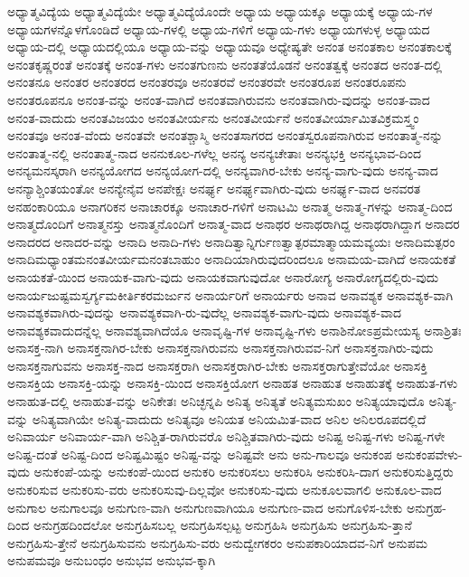 {ಅಧ್ಯಾತ್ಮವಿದ್ಯೆಯ
ಅಧ್ಯಾತ್ಮವಿದ್ಯೆಯೇ
ಅಧ್ಯಾತ್ಮವಿದ್ಯೆಯೊಂದೇ
ಅಧ್ಯಾಯ
ಅಧ್ಯಾಯಕ್ಕೂ
ಅಧ್ಯಾಯಕ್ಕೆ
ಅಧ್ಯಾಯ-ಗಳ
ಅಧ್ಯಾಯಗಳನ್ನೊಳಗೊಂಡಿದೆ
ಅಧ್ಯಾಯ-ಗಳಲ್ಲಿ
ಅಧ್ಯಾಯ-ಗಳಿಗೆ
ಅಧ್ಯಾಯ-ಗಳು
ಅಧ್ಯಾಯಗಳುಳ್ಳ
ಅಧ್ಯಾಯದ
ಅಧ್ಯಾಯ-ದಲ್ಲಿ
ಅಧ್ಯಾಯದಲ್ಲಿಯೂ
ಅಧ್ಯಾಯ-ವನ್ನು
ಅಧ್ಯಾಯವೂ
ಅಧ್ಯೇಷ್ಯತೇ
ಅನಂತ
ಅನಂತಕಾಲ
ಅನಂತಕಾಲಕ್ಕೆ
ಅನಂತಕೃಷ್ಣರಂತೆ
ಅನಂತಕ್ಕೆ
ಅನಂತ-ಗಳು
ಅನಂತಗುಣನು
ಅನಂತತೆಯೊಡನೆ
ಅನಂತತ್ವಕ್ಕೆ
ಅನಂತದ
ಅನಂತ-ದಲ್ಲಿ
ಅನಂತನೂ
ಅನಂತರ
ಅನಂತರದ
ಅನಂತರವೂ
ಅನಂತರವೆ
ಅನಂತರವೇ
ಅನಂತರೂಪ
ಅನಂತರೂಪನು
ಅನಂತರೂಪನೂ
ಅನಂತ-ವನ್ನು
ಅನಂತ-ವಾಗಿದೆ
ಅನಂತವಾಗಿರುವನು
ಅನಂತವಾಗಿರು-ವುದನ್ನು
ಅನಂತ-ವಾದ
ಅನಂತ-ವಾದುದು
ಅನಂತವಿಜಯಂ
ಅನಂತವೀರ್ಯನು
ಅನಂತವೀರ್ಯನೆ
ಅನಂತವೀರ್ಯಾಮಿತವಿಕ್ರಮಸ್ತ್ವಂ
ಅನಂತವೂ
ಅನಂತ-ವೆಂದು
ಅನಂತವೇ
ಅನಂತಶ್ಚಾಸ್ಮಿ
ಅನಂತಸಾಗರದ
ಅನಂತಸ್ವರೂಪನಾಗಿರುವ
ಅನಂತಾತ್ಮ-ನನ್ನು
ಅನಂತಾತ್ಮ-ನಲ್ಲಿ
ಅನಂತಾತ್ಮ-ನಾದ
ಅನನುಕೂಲ-ಗಳೆಲ್ಲ
ಅನನ್ಯ
ಅನನ್ಯಚೇತಾಃ
ಅನನ್ಯಭಕ್ತಿ
ಅನನ್ಯಭಾವ-ದಿಂದ
ಅನನ್ಯಮನಸ್ಕರಾಗಿ
ಅನನ್ಯಯೋಗದ
ಅನನ್ಯಯೋಗ-ದಲ್ಲಿ
ಅನನ್ಯವಾಗಿರ-ಬೇಕು
ಅನನ್ಯ-ವಾಗು-ವುದು
ಅನನ್ಯ-ವಾದ
ಅನನ್ಯಾಶ್ಚಿಂತಯಂತೋ
ಅನನ್ಯೇನೈವ
ಅನಪೇಕ್ಷಃ
ಅನರ್ಘ್ಯ
ಅನರ್ಘ್ಯವಾಗಿರು-ವುದು
ಅನರ್ಘ್ಯ-ವಾದ
ಅನವರತ
ಅನಹಂಕಾರಿಯೂ
ಅನಾಗರಿಕನ
ಅನಾಚಾರಕ್ಕೂ
ಅನಾಚಾರ-ಗಳಿಗೆ
ಅನಾಟಮಿ
ಅನಾತ್ಮ
ಅನಾತ್ಮ-ಗಳನ್ನು
ಅನಾತ್ಮ-ದಿಂದ
ಅನಾತ್ಮದೊಂದಿಗೆ
ಅನಾತ್ಮನಸ್ತು
ಅನಾತ್ಮನೊಂದಿಗೆ
ಅನಾತ್ಮ-ವಾದ
ಅನಾಥರ
ಅನಾಥರಾಗಿದ್ದ
ಅನಾಥರಾಗಿದ್ದಾಗ
ಅನಾದರ
ಅನಾದರದ
ಅನಾದರ-ವನ್ನು
ಅನಾದಿ
ಅನಾದಿ-ಗಳು
ಅನಾದಿತ್ವಾನ್ನಿರ್ಗುಣತ್ವಾತ್ಪರಮಾತ್ಮಾಯಮವ್ಯಯಃ
ಅನಾದಿಮತ್ಪರಂ
ಅನಾದಿಮಧ್ಯಾಂತಮನಂತವೀರ್ಯಮನಂತಬಾಹುಂ
ಅನಾದಿಯಾಗಿರುವುದರಿಂದಲೂ
ಅನಾಮಯ-ವಾಗಿದೆ
ಅನಾಯಕತೆ
ಅನಾಯಕತೆ-ಯಿಂದ
ಅನಾಯಕ-ವಾಗು-ವುದು
ಅನಾಯಕವಾಗುವುದೋ
ಅನಾರೋಗ್ಯ
ಅನಾರೋಗ್ಯದಲ್ಲಿರು-ವುದು
ಅನಾರ್ಯಜುಷ್ಟಮಸ್ವರ್ಗ್ಯಮಕೀರ್ತಿಕರಮರ್ಜುನ
ಅನಾರ್ಯರಿಗೆ
ಅನಾರ್ಯರು
ಅನಾವ
ಅನಾವಶ್ಯಕ
ಅನಾವಶ್ಯಕ-ವಾಗಿ
ಅನಾವಶ್ಯಕವಾಗಿರು-ವುದನ್ನು
ಅನಾವಶ್ಯಕವಾಗಿ-ರು-ವುದೆಲ್ಲ
ಅನಾವಶ್ಯಕ-ವಾಗು-ವುದು
ಅನಾವಶ್ಯಕ-ವಾದ
ಅನಾವಶ್ಯಕವಾದುದನ್ನೆಲ್ಲ
ಅನಾವಶ್ಯವಾಗಿದೆಯೊ
ಅನಾವೃಷ್ಟಿ-ಗಳ
ಅನಾವೃಷ್ಟಿ-ಗಳು
ಅನಾಶಿನೋಽಪ್ರಮೇಯಸ್ಯ
ಅನಾಶ್ರಿತಃ
ಅನಾಸಕ್ತ-ನಾಗಿ
ಅನಾಸಕ್ತನಾಗಿರ-ಬೇಕು
ಅನಾಸಕ್ತನಾಗಿರುವನು
ಅನಾಸಕ್ತನಾಗಿರುವವ-ನಿಗೆ
ಅನಾಸಕ್ತನಾಗಿರು-ವುದು
ಅನಾಸಕ್ತನಾಗುವನು
ಅನಾಸಕ್ತ-ನಾದ
ಅನಾಸಕ್ತರಾಗಿ
ಅನಾಸಕ್ತರಾಗಿರ-ಬೇಕು
ಅನಾಸಕ್ತರಾಗುತ್ತೇವೆಯೋ
ಅನಾಸಕ್ತಿ
ಅನಾಸಕ್ತಿಯ
ಅನಾಸಕ್ತಿ-ಯನ್ನು
ಅನಾಸಕ್ತಿ-ಯಿಂದ
ಅನಾಸಕ್ತಿಯೋಗ
ಅನಾಹತ
ಅನಾಹುತ
ಅನಾಹುತಕ್ಕೆ
ಅನಾಹುತ-ಗಳು
ಅನಾಹುತ-ದಲ್ಲಿ
ಅನಾಹುತ-ವನ್ನು
ಅನಿಕೇತಃ
ಅನಿಚ್ಛನ್ನಪಿ
ಅನಿತ್ಯ
ಅನಿತ್ಯತೆ
ಅನಿತ್ಯಮಸುಖಂ
ಅನಿತ್ಯಯಾವುದೊ
ಅನಿತ್ಯ-ವನ್ನು
ಅನಿತ್ಯವಾಗಿಯೇ
ಅನಿತ್ಯ-ವಾದುದು
ಅನಿತ್ಯವೂ
ಅನಿಯತ
ಅನಿಯಮಿತ-ವಾದ
ಅನಿಲ
ಅನಿಲರೂಪದಲ್ಲಿದೆ
ಅನಿವಾರ್ಯ
ಅನಿವಾರ್ಯ-ವಾಗಿ
ಅನಿಶ್ಚಿತ-ರಾಗಿರುವರೊ
ಅನಿಶ್ಚಿತವಾಗಿರು-ವುದು
ಅನಿಷ್ಟ
ಅನಿಷ್ಟ-ಗಳು
ಅನಿಷ್ಟ-ಗಳೇ
ಅನಿಷ್ಟ-ದಂತೆ
ಅನಿಷ್ಟ-ದಿಂದ
ಅನಿಷ್ಟಮಿಷ್ಟಂ
ಅನಿಷ್ಟ-ವನ್ನು
ಅನಿಷ್ಟವೇ
ಅನು
ಅನು-ಗಾಲವೂ
ಅನುಕಂಪ
ಅನುಕಂಪವೇಳು-ವುದು
ಅನುಕಂಪೆ-ಯನ್ನು
ಅನುಕಂಪೆ-ಯಿಂದ
ಅನುಕರಿ
ಅನುಕರಿಸಲು
ಅನುಕರಿಸಿ
ಅನುಕರಿಸಿ-ದಾಗ
ಅನುಕರಿಸುತ್ತಿದ್ದರು
ಅನುಕರಿಸುವ
ಅನುಕರಿಸು-ವರು
ಅನುಕರಿಸುವು-ದಿಲ್ಲವೋ
ಅನುಕರಿಸು-ವುದು
ಅನುಕೂಲವಾಗಲಿ
ಅನುಕೂಲ-ವಾದ
ಅನುಗಾಲ
ಅನುಗಾಲವೂ
ಅನುಗುಣ-ವಾಗಿ
ಅನುಗುಣವಾಗಿಯೂ
ಅನುಗುಣ-ವಾದ
ಅನುಗೊಳಿಸ-ಬೇಕು
ಅನುಗ್ರಹ-ದಿಂದ
ಅನುಗ್ರಹದಿಂದಲೋ
ಅನುಗ್ರಹಿಸಬಲ್ಲ
ಅನುಗ್ರಹಿಸಲ್ಪಟ್ಟ
ಅನುಗ್ರಹಿಸಿ
ಅನುಗ್ರಹಿಸು
ಅನುಗ್ರಹಿಸು-ತ್ತಾನೆ
ಅನುಗ್ರಹಿಸು-ತ್ತೇನೆ
ಅನುಗ್ರಹಿಸುವನು
ಅನುಗ್ರಹಿಸು-ವರು
ಅನುದ್ವೇಗಕರಂ
ಅನುಪಕಾರಿಯಾದವ-ನಿಗೆ
ಅನುಪಮ
ಅನುಪಮವೂ
ಅನುಬಂಧಂ
ಅನುಭವ
ಅನುಭವ-ಕ್ಕಾಗಿ
}
